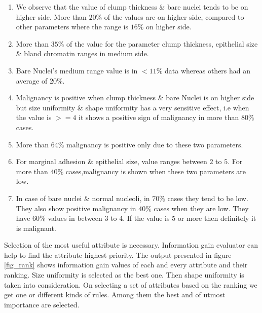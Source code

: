 \documentclass[conference]{IEEEtran}
\begin{document}
\begin{enumerate}
  \item We observe that the value of clump thickness \& bare nuclei tends to be on higher side. More than $20\%$ of the values are on higher side, compared to other parameters where the range is  $16\%$ on higher side.

  \item More than $35\%$ of the value for the parameter clump thickness, epithelial size \& bland chromatin ranges in medium side.

  \item Bare Nuclei's medium range value is in $< 11\%$ data whereas others had an average of $20\%$.

  \item Malignancy is positive when clump thickness \& bare Nuclei is on higher side but size uniformity \& shape uniformity has a very sensitive effect, i.e when the value is $>=4$ it shows a positive sign of malignancy in more than $80\%$ cases.

  \item More than $64\%$ malignancy is positive only due to these two parameters.

  \item For marginal adhesion \& epithelial size, value ranges between $2$ to $5$. For more than $40\%$ cases,malignancy is shown when these two parameters are low.

  \item In case of bare nuclei \& normal nucleoli, in $70\%$ cases they tend to be low. They also show positive malignancy in $40\%$ cases when they are low. They have $60\%$ values in between $3$ to $4$. If the value is $5$ or more then definitely it is malignant.
\end{enumerate}

Selection of the most useful attribute is necessary. Information gain evaluator can help to find the attribute highest priority. The output presented  in figure \ref{fig_rank} shows information gain values of each and every attribute and their ranking. Size uniformity is selected as the best one. Then shape uniformity is taken into consideration. On selecting a set of attributes based on the ranking we get one or different kinds of rules. Among them the best and of utmost importance are selected.
\end{document}
